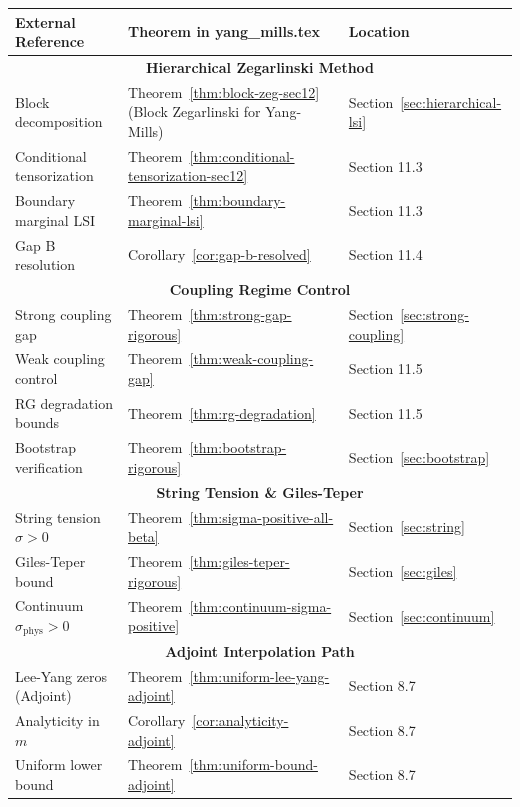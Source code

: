 \begin{tcolorbox}[colback=blue!5!white, colframe=blue!60!black, title=\textbf{Complete Cross-Reference Guide}]
\begin{center}
\renewcommand{\arraystretch}{1.4}
\begin{tabular}{|p{4cm}|p{5cm}|p{3.5cm}|}
\hline
\textbf{External Reference} & \textbf{Theorem in yang\_mills.tex} & \textbf{Location} \\
\hline
\hline
\multicolumn{3}{|c|}{\textbf{Hierarchical Zegarlinski Method}} \\
\hline
Block decomposition & Theorem~\ref{thm:block-zeg-sec12} (Block Zegarlinski for Yang-Mills) & Section~\ref{sec:hierarchical-lsi} \\
Conditional tensorization & Theorem~\ref{thm:conditional-tensorization-sec12} & Section 11.3 \\
Boundary marginal LSI & Theorem~\ref{thm:boundary-marginal-lsi} & Section 11.3 \\
Gap B resolution & Corollary~\ref{cor:gap-b-resolved} & Section 11.4 \\
\hline
\hline
\multicolumn{3}{|c|}{\textbf{Coupling Regime Control}} \\
\hline
Strong coupling gap & Theorem~\ref{thm:strong-gap-rigorous} & Section~\ref{sec:strong-coupling} \\
Weak coupling control & Theorem~\ref{thm:weak-coupling-gap} & Section 11.5 \\
RG degradation bounds & Theorem~\ref{thm:rg-degradation} & Section 11.5 \\
Bootstrap verification & Theorem~\ref{thm:bootstrap-rigorous} & Section~\ref{sec:bootstrap} \\
\hline
\hline
\multicolumn{3}{|c|}{\textbf{String Tension \& Giles-Teper}} \\
\hline
String tension $\sigma > 0$ & Theorem~\ref{thm:sigma-positive-all-beta} & Section~\ref{sec:string} \\
Giles-Teper bound & Theorem~\ref{thm:giles-teper-rigorous} & Section~\ref{sec:giles} \\
Continuum $\sigma_{\mathrm{phys}} > 0$ & Theorem~\ref{thm:continuum-sigma-positive} & Section~\ref{sec:continuum} \\
\hline
\hline
\multicolumn{3}{|c|}{\textbf{Adjoint Interpolation Path}} \\
\hline
Lee-Yang zeros (Adjoint) & Theorem~\ref{thm:uniform-lee-yang-adjoint} & Section 8.7 \\
Analyticity in $m$ & Corollary~\ref{cor:analyticity-adjoint} & Section 8.7 \\
Uniform lower bound & Theorem~\ref{thm:uniform-bound-adjoint} & Section 8.7 \\

\end{tabular}
\end{center}
\end{tcolorbox}
